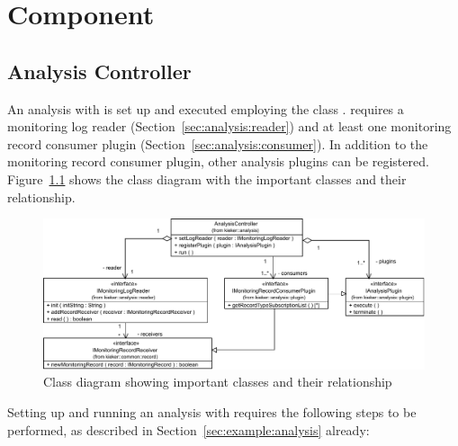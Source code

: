 % 


\chapter{\KiekerAnalysisPart{} Component}\label{chap:componentsAnalysis}


\section{Analysis Controller}\label{sec:analysis:controller}

An analysis with \KiekerAnalysisPart{} is set up and executed employing %
the class . %
\KiekerAnalysisPart{} requires a monitoring log reader %
(Section~\ref{sec:analysis:reader}) and at least %
one monitoring record consumer plugin (Section~\ref{sec:analysis:consumer}). %
In addition to the monitoring record consumer plugin, %
other analysis plugins can be registered. %
Figure~\ref{fig:analysisController:classdiagram} shows the class diagram %
with the important \KiekerAnalysisPart{} classes and their relationship. %

\begin{figure}[h]\centering
\includegraphics[scale=0.7]{images/kieker_AnalysisControlleruserguide-modified}
\caption{Class diagram showing important \KiekerAnalysisPart{} classes and their relationship}
\label{fig:analysisController:classdiagram}
\end{figure}

\noindent Setting up and running an analysis with \KiekerAnalysisPart{} requires the %
following steps to be performed, as described in Section~\ref{sec:example:analysis} already:\\


